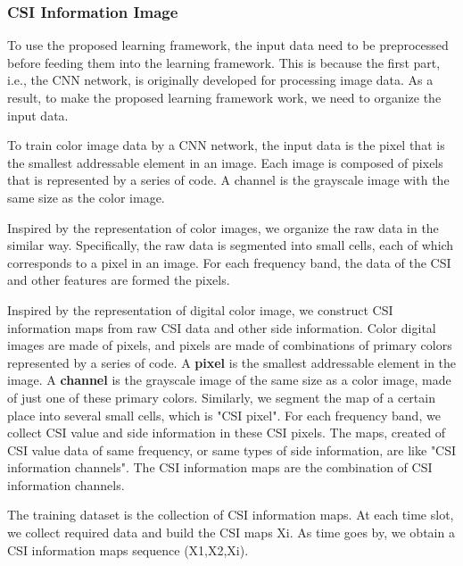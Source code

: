 \documentclass[10pt,journal,cspaper,compsoc]{IEEEtran}
\begin{document}
\subsubsection{CSI Information Image}

To use the proposed learning framework, the input data need to be preprocessed before feeding them into the learning framework. This is because the first part, i.e., the CNN network, is originally developed for processing image data. As a result, to make the proposed learning framework work, we need to organize the input data.


To train color image data by a CNN network, the input data is the pixel that is the smallest addressable element in an image. Each image is composed of pixels that is represented by a series of code. A channel is the grayscale image with the same size as the color image.

Inspired by the representation of color images, we organize the raw data in the similar way. Specifically, the raw data is segmented into small cells, each of which corresponds to a pixel in an image. For each frequency band, the data of the CSI and other features are formed the pixels.

Inspired by the representation of digital color image, we  construct CSI information maps from raw CSI data and other side information. Color digital images are made of pixels, and pixels are made of combinations of primary colors represented by a series of code. A \textbf{pixel} is the smallest addressable element in the image. A \textbf{channel} is the grayscale image of the same size as a color image, made of just one of these primary colors.  Similarly, we segment the map of a certain place into several small cells, which is "CSI pixel". For each frequency band, we collect CSI value and side information in these CSI pixels. The maps, created of CSI value data of same frequency, or same types of side information, are like "CSI information channels". The CSI information maps are the combination of CSI information channels. 

The training dataset is the collection of CSI information maps. At each time slot, we collect required data and build the CSI maps Xi. As time goes by, we obtain a CSI information maps sequence (X1,X2,Xi).
\end{document}
